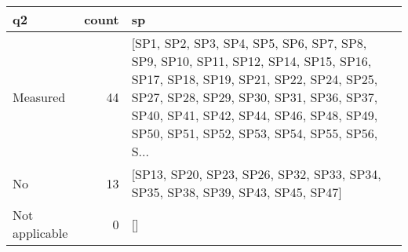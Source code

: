 \begin{tabular}{lrl}
\toprule
             q2 &  count &                                                                                                                                                                                                                                                              sp \\
\midrule
       Measured &     44 &  [SP1, SP2, SP3, SP4, SP5, SP6, SP7, SP8, SP9, SP10, SP11, SP12, SP14, SP15, SP16, SP17, SP18, SP19, SP21, SP22, SP24, SP25, SP27, SP28, SP29, SP30, SP31, SP36, SP37, SP40, SP41, SP42, SP44, SP46, SP48, SP49, SP50, SP51, SP52, SP53, SP54, SP55, SP56, S... \\
             No &     13 &                                                                                                                                                                                  [SP13, SP20, SP23, SP26, SP32, SP33, SP34, SP35, SP38, SP39, SP43, SP45, SP47] \\
 Not applicable &      0 &                                                                                                                                                                                                                                                              [] \\
\bottomrule
\end{tabular}
